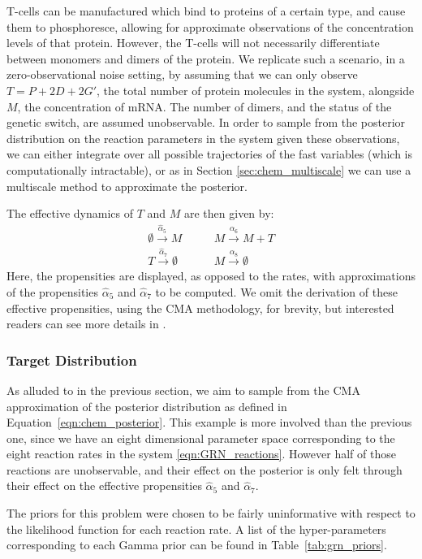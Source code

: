 \documentclass[final]{siamltex}
\begin{document}
T-cells can be manufactured which bind to
proteins of a certain type, and cause them to phosphoresce, allowing
for approximate observations of the concentration levels of that
protein. However, the T-cells will not necessarily differentiate
between monomers and dimers of the protein. We replicate such a
scenario, in a zero-observational noise setting, by assuming that we
can only observe $T=P + 2D + 2G'$, the total number of protein
molecules in the system, alongside $M$, the concentration of mRNA. The
number of dimers, and the status of the genetic switch, are assumed
unobservable. In
order to sample from the posterior distribution on the reaction
parameters in the system given these observations, we can either integrate over all possible
trajectories of the fast variables (which is computationally
intractable), or as in Section \ref{sec:chem_multiscale} we can use a
multiscale method to approximate the posterior. 

The effective dynamics of $T$ and $M$ are then given by:
\begin{align}
	\emptyset \xrightarrow{\hat{\alpha}_5} M \quad & \quad M\xrightarrow{\alpha_6} M+T  \label{eqn:GRN_eff} \\
	T \xrightarrow{\hat{\alpha}_7} \emptyset \quad & \quad M \xrightarrow{\alpha_8} \emptyset \nonumber
\end{align}
Here, the propensities are displayed, as opposed to the rates, with
approximations of the propensities $\hat{\alpha}_5$ and
$\hat{\alpha}_7$ to be computed. We omit the derivation of these
effective propensities, using the CMA methodology, for brevity, but
interested readers can see more details in \cite{russ2017parallel}.

\subsubsection{Target Distribution}
As alluded to in the previous section, we aim to sample from the CMA
approximation of the posterior distribution as defined in
Equation~\eqref{eqn:chem_posterior}. This example is more involved
than the previous one, since we have an eight dimensional parameter
space corresponding to the eight reaction rates in the system
\eqref{eqn:GRN_reactions}. However half of those reactions are
unobservable, and their effect on the posterior is only felt through
their effect on the effective propensities $\hat{\alpha}_5$ and $\hat{\alpha}_7$.

The priors for this problem were chosen to be fairly uninformative with respect to the likelihood function for each reaction rate. A list of the hyper-parameters corresponding to each Gamma prior can be found in Table~\ref{tab:grn_priors}.
\end{document}
